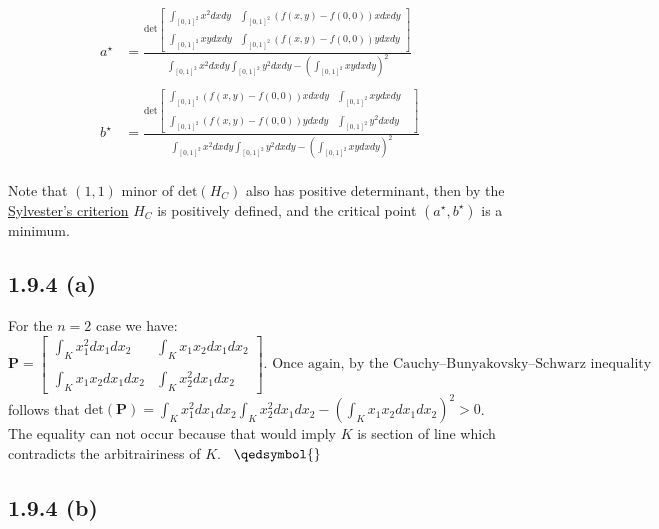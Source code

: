 \documentclass{exam}
\begin{document}
\begin{equation}
    \begin{aligned}
        a^\star&=
        \displaystyle \frac{ 
            \text{det}\begin{bmatrix}
                \displaystyle\int_{[0,1]^2} x^2 d x d y & \displaystyle\int_{[0,1]^2} (f(x,y) - f(0,0)) x d x d y\\
                \\
                \displaystyle\int_{[0,1]^2} xy d x d y & \displaystyle\int_{[0,1]^2} (f(x,y) - f(0,0)) y d x d y
            \end{bmatrix}
            }
            {
              \displaystyle\int_{[0,1]^2} x^2 d x d y \displaystyle\int_{[0,1]^2} y^2 d x d y  - (\displaystyle\int_{[0,1]^2} xy d x d y )^2
            }\\
        \\
        b^\star &=
       \displaystyle \frac{ 
           \text{det}\begin{bmatrix}
                \displaystyle\int_{[0,1]^2} (f(x,y) - f(0,0)) x d x d y & \displaystyle\int_{[0,1]^2} xy d x d y \\
               \\
                \displaystyle\int_{[0,1]^2} (f(x,y) - f(0,0)) y d x d y & \displaystyle\int_{[0,1]^2} y^2 d x d y &
           \end{bmatrix}
           }
           {
             \displaystyle\int_{[0,1]^2} x^2 d x d y \displaystyle\int_{[0,1]^2} y^2 d x d y  - (\displaystyle\int_{[0,1]^2} xy d x d y )^2
           }
    \end{aligned}
\end{equation}\\
Note that $(1,1)$ minor of $\text{det}( H_{C})$ also has positive determinant, then by the \href{https://en.wikipedia.org/wiki/Sylvester%27s_criterion}{Sylvester's criterion} $H_{C}$ is positively defined, and the critical point $(a^\star,b^\star)$ is a minimum. 
\\
\subsection*{1.9.4 (a)}
For the $n = 2$ case we have:\\
\begin{equation*}
    \pmb{\text{P}} = \begin{bmatrix}
        \displaystyle\int_{K} x_1^2 d x_1 d x_2 & \displaystyle\int_{K} x_1 x_2 d x_1 d x_2\\
       \\
       \displaystyle\int_{K} x_1 x_2 d x_1 d x_2 & \displaystyle\int_{K} x_2^2 d x_1 d x_2 
    \end{bmatrix} \text{. Once again, by the Cauchy–Bunyakovsky–Schwarz inequality}
\end{equation*}
follows that $\text{det}(\pmb{\text{P}}) = \displaystyle\int_{K} x_1^2d x_1 d x_2  \displaystyle\int_{K} x_2^2 d x_1 d x_2  - (\displaystyle\int_{K} x_1 x_2 d x_1 d x_2 )^2 > 0$. The equality can not occur because that would imply $K$ is section of line which contradicts the arbitrairiness of $K$. \ $\qedsymbol{}$
\subsection*{1.9.4 (b)}
\end{document}
